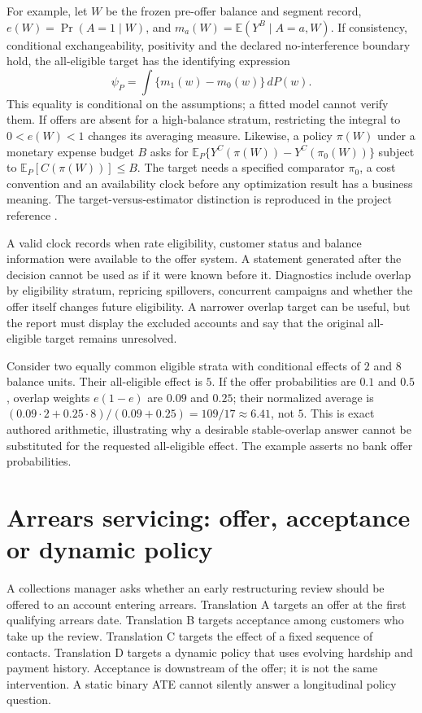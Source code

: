 For example, let $W$ be the frozen pre-offer balance and segment record, $e(W)=\Pr(A=1\mid W)$, and $m_a(W)=\mathbb E(Y^B\mid A=a,W)$. If consistency, conditional exchangeability, positivity and the declared no-interference boundary hold, the all-eligible target has the identifying expression
\[
 \psi_P=\int\{m_1(w)-m_0(w)\}\,dP(w).
\]
This equality is conditional on the assumptions; a fitted model cannot verify them. If offers are absent for a high-balance stratum, restricting the integral to $0<e(W)<1$ changes its averaging measure. Likewise, a policy $\pi(W)$ under a monetary expense budget $B$ asks for $\mathbb E_P\{Y^C(\pi(W))-Y^C(\pi_0(W))\}$ subject to $\mathbb E_P[C(\pi(W))]\leq B$. The target needs a specified comparator $\pi_0$, a cost convention and an availability clock before any optimization result has a business meaning. The target-versus-estimator distinction is reproduced in the project reference \citep{exec13_formulation_targets}.

A valid clock records when rate eligibility, customer status and balance information were available to the offer system. A statement generated after the decision cannot be used as if it were known before it. Diagnostics include overlap by eligibility stratum, repricing spillovers, concurrent campaigns and whether the offer itself changes future eligibility. A narrower overlap target can be useful, but the report must display the excluded accounts and say that the original all-eligible target remains unresolved.

Consider two equally common eligible strata with conditional effects of $2$ and $8$ balance units. Their all-eligible effect is $5$. If the offer probabilities are $0.1$ and $0.5$, overlap weights $e(1-e)$ are $0.09$ and $0.25$; their normalized average is $(0.09\cdot2+0.25\cdot8)/(0.09+0.25)=109/17\approx6.41$, not $5$. This is exact authored arithmetic, illustrating why a desirable stable-overlap answer cannot be substituted for the requested all-eligible effect. The example asserts no bank offer probabilities.

\section{Arrears servicing: offer, acceptance or dynamic policy}

A collections manager asks whether an early restructuring review should be offered to an account entering arrears. Translation A targets an offer at the first qualifying arrears date. Translation B targets acceptance among customers who take up the review. Translation C targets the effect of a fixed sequence of contacts. Translation D targets a dynamic policy that uses evolving hardship and payment history. Acceptance is downstream of the offer; it is not the same intervention. A static binary ATE cannot silently answer a longitudinal policy question.

